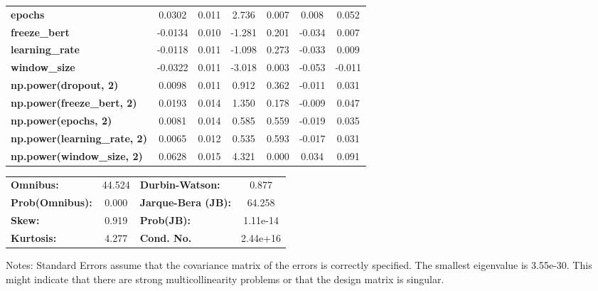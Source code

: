 \begin{center}
\begin{tabular}{lcccccc}
\textbf{epochs}                            &       0.0302  &        0.011     &     2.736  &         0.007        &        0.008    &        0.052     \\
\textbf{freeze\_bert}                      &      -0.0134  &        0.010     &    -1.281  &         0.201        &       -0.034    &        0.007     \\
\textbf{learning\_rate}                    &      -0.0118  &        0.011     &    -1.098  &         0.273        &       -0.033    &        0.009     \\
\textbf{window\_size}                      &      -0.0322  &        0.011     &    -3.018  &         0.003        &       -0.053    &       -0.011     \\
\textbf{np.power(dropout, 2)}              &       0.0098  &        0.011     &     0.912  &         0.362        &       -0.011    &        0.031     \\
\textbf{np.power(freeze\_bert, 2)}         &       0.0193  &        0.014     &     1.350  &         0.178        &       -0.009    &        0.047     \\
\textbf{np.power(epochs, 2)}               &       0.0081  &        0.014     &     0.585  &         0.559        &       -0.019    &        0.035     \\
\textbf{np.power(learning\_rate, 2)}       &       0.0065  &        0.012     &     0.535  &         0.593        &       -0.017    &        0.031     \\
\textbf{np.power(window\_size, 2)}         &       0.0628  &        0.015     &     4.321  &         0.000        &        0.034    &        0.091     \\
\bottomrule
\end{tabular}
\begin{tabular}{lclc}
\textbf{Omnibus:}       & 44.524 & \textbf{  Durbin-Watson:     } &    0.877  \\
\textbf{Prob(Omnibus):} &  0.000 & \textbf{  Jarque-Bera (JB):  } &   64.258  \\
\textbf{Skew:}          &  0.919 & \textbf{  Prob(JB):          } & 1.11e-14  \\
\textbf{Kurtosis:}      &  4.277 & \textbf{  Cond. No.          } & 2.44e+16  \\
\bottomrule
\end{tabular}
\end{center}

Notes: \newline
 [1] Standard Errors assume that the covariance matrix of the errors is correctly specified. \newline
 [2] The smallest eigenvalue is 3.55e-30. This might indicate that there are \newline
 strong multicollinearity problems or that the design matrix is singular.